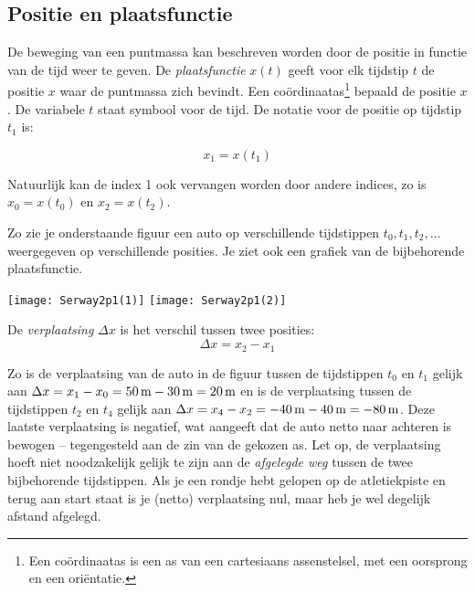 \documentclass{ximera}
\begin{document}
	\author{Bart Lambregs}
    \xmsource


\subsection{Positie en plaatsfunctie}

De beweging van een puntmassa kan beschreven worden door de positie in functie van de tijd weer te geven. De \emph{plaatsfunctie} $x(t)$ geeft voor elk tijdstip \(t\) de positie \(x\) waar de puntmassa zich bevindt. Een coördinaatas\footnote{Een coördinaatas is een as van een cartesiaans assenstelsel, met een oorsprong en een oriëntatie.} bepaald de positie \(x\). De variabele \(t\) staat symbool voor de tijd. De notatie voor de positie op tijdstip $t_1$ is: 

\[
x_1=x(t_1)
\]

Natuurlijk kan de index 1 ook vervangen worden door andere indices, zo is $x_0=x(t_0)$ en $x_2=x(t_2)$.

Zo zie je onderstaande figuur een auto op verschillende tijdstippen $t_0,t_1, t_2,\ldots$ weer\-ge\-ge\-ven op verschillende posities. Je ziet ook een grafiek van de bijbehorende plaatsfunctie.

\begin{image}
\hfill
\texttt{[image: Serway2p1(1)]}
\hfill
\texttt{[image: Serway2p1(2)]}
\hfill

\end{image}


\begin{definition}
De \emph{verplaatsing} \(\Delta x\) is het verschil tussen twee posities:
\[
\Delta x = x_2-x_1
\]
\end{definition}

Zo is de verplaatsing van de auto in de figuur tussen de tijdstippen $t_0$ en $t_1$ gelijk aan $\Delta x = x_1-x_0=50\rm\,m-30\rm\,m=20\rm\,m$ en is de verplaatsing tussen de tijdstippen $t_2$ en $t_4$ gelijk aan $\Delta x=x_4-x_2=-40\rm\,m-40\rm\,m=-80\rm\,m$. Deze laatste verplaatsing is negatief, wat aangeeft dat de auto netto naar achteren is bewogen -- tegengesteld aan de zin van de gekozen as.
Let op, de verplaatsing hoeft niet noodzakelijk gelijk te zijn aan de \emph{afgelegde weg} tussen de twee bijbehorende tijdstippen. Als je een rondje hebt gelopen op de atletiekpiste en terug aan start staat is je (netto) verplaatsing nul, maar heb je wel degelijk afstand afgelegd.
\end{document}
